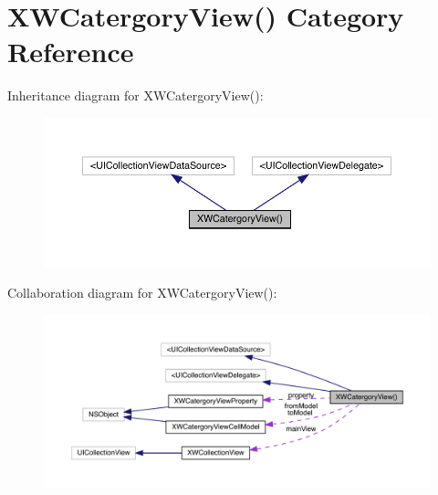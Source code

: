 \hypertarget{category_x_w_catergory_view_07_08}{}\section{X\+W\+Catergory\+View() Category Reference}
\label{category_x_w_catergory_view_07_08}


Inheritance diagram for X\+W\+Catergory\+View()\+:\nopagebreak
\begin{figure}[H]
\begin{center}
\leavevmode
\includegraphics[width=350pt]{category_x_w_catergory_view_07_08__inherit__graph}
\end{center}
\end{figure}


Collaboration diagram for X\+W\+Catergory\+View()\+:\nopagebreak
\begin{figure}[H]
\begin{center}
\leavevmode
\includegraphics[width=350pt]{category_x_w_catergory_view_07_08__coll__graph}
\end{center}
\end{figure}
